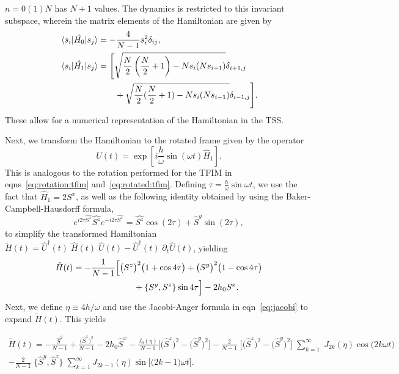 \documentclass[%
reprint,
superscriptaddress,
linenumbers,
amsmath,amssymb,
aps,
prb,
showkeys,
]{revtex4-2}
\begin{document}
	$n= 0 (1) N$ has $N+1$ values. The dynamics is restricted to this invariant subspace, wherein the matrix elements of the Hamiltonian are given by
	\begin{align}
		\mel{s_i}{\hat{H_0}}{s_j} &= -\frac{4}{N-1} s^2_i \delta_{ij},\nonumber\\
		\mel{s_i}{\hat{H_1}}{s_j} &= \Bigg[\sqrt{\frac{N}{2}\left(\frac{N}{2}+1\right) - Ns_i(Ns_{i + 1})}\delta_{i+1, j} \nonumber\\ 
		&\hskip 0.7cm +\sqrt{\frac{N}{2}(\frac{N}{2}+1) - Ns_i(Ns_{i- 1})}\delta_{i-1,j}\Bigg].
		\label{eq:lmg:tssham}
	\end{align}
	These allow for a numerical representation of the Hamiltonian in the TSS.
	
	Next, we transform the Hamiltonian to the rotated frame given by the operator
	\begin{equation}
	\hat{U}(t)=\exp [i \frac{h}{\omega} \sin (\omega t) \hat{H}_{1}].
	\end{equation}
	This is analogous to the rotation performed for the TFIM in eqns~\ref{eq:rotation:tfim} and~\ref{eq:rotated:tfim}. Defining $\tau = \displaystyle\frac{h}{\omega}\sin{\omega t}$, we use the fact that $\hat{H}_1 = 2 S^x$, as well as the following identity obtained by using the Baker-Campbell-Hausdorff formula,
	\begin{equation}
	e^{i 2\tau\hat{S^{x}}} \hat{S^{z}} e^{-i 2\tau \hat{S^{x}}}=\hat{S^{z}} \cos \left(2\tau\right)+\hat{S}^{y} \sin (2\tau),
	\end{equation}
	to simplify the transformed Hamiltonian $\tilde{H}(t) = \hat{U}^\dagger(t)\;\hat{H}(t)\;\hat{U}(t) - \hat{U}^\dagger(t)\;\partial_t\hat{U}(t)$, yielding
	\begin{align}
		\label{eq:lmg_rotated}
		\tilde{H}(t)& = -\frac{1}{N-1}\Big[\big(S^z\big)^2 \big(1+\cos{4\tau}\big)+ \big(S^y\big)^2 \big(1-\cos{4\tau}\big)\nonumber \\  
		&\hskip 2.5cm + \pb{S^y}{S^z}
		\sin{4\tau}\Big] - 2 h_0 S^x.
	\end{align}
	Next, we define $\eta\equiv 4h/\omega$ and use the Jacobi-Anger formula in eqn~\ref{eq:jacobi}
	to expand $\tilde{H}(t)$. This yields
		\begin{widetext}
		\begin{multline}
			\label{eq:lmg_jacobiexp}
			\tilde{H}(t)= -\frac{\hat{S}^2}{N-1} +  \frac{\big(\hat{S}^x\big)^{2}}{N-1} - 2h_0 \hat{S}^x - \frac{J_0(\eta)}{N-1}\bigg[\big(\hat{S}^z\big)^{2} - \big(\hat{S}^y\big)^{2} \bigg] - \frac{2}{N-1}\;\Big[\big( \hat{S}^z\big)^2 - \big( \hat{S}^y\big)^2\Big]\;\sum^\infty_{k=1}\;J_{2k}(\eta)\cos{\big(2k\omega t\big)}\\
			- \frac{2}{N-1}\;\big\{ \hat{S}^y,  \hat{S}^z \big\}\;\sum^\infty_{k=1}J_{2k-1}(\eta)  \sin{\Big[\big(2k-1\big)\omega t\Big]}.
		\end{multline}
	\end{widetext}
\end{document}
